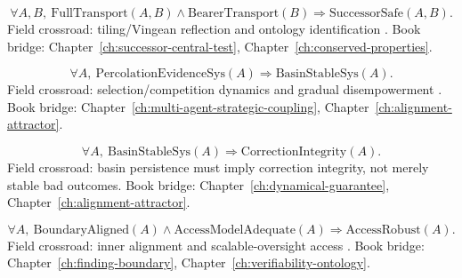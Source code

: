 \begin{assumption}
\label{appi:ass:mb5}
\begin{equation}
\label{appi:eq:mb5}
\forall A,B,\ \mathrm{FullTransport}(A,B)\wedge \mathrm{BearerTransport}(B)\Rightarrow \mathrm{SuccessorSafe}(A,B).
\end{equation}
Field crossroad: tiling/Vingean reflection and ontology identification \autocite{yudkowsky2013tiling,deblanc2011ontological}.
Book bridge: Chapter~\ref{ch:successor-central-test}, Chapter~\ref{ch:conserved-properties}.
\end{assumption}

\begin{assumption}
\label{appi:ass:mb6a}
\begin{equation}
\label{appi:eq:mb6a}
\forall A,\ \mathrm{PercolationEvidenceSys}(A)\Rightarrow \mathrm{BasinStableSys}(A).
\end{equation}
Field crossroad: selection/competition dynamics and gradual disempowerment \autocite{christiano2019failure,critch2020ai}.
Book bridge: Chapter~\ref{ch:multi-agent-strategic-coupling}, Chapter~\ref{ch:alignment-attractor}.
\end{assumption}

\begin{assumption}
\label{appi:ass:mb6b}
\begin{equation}
\label{appi:eq:mb6b}
\forall A,\ \mathrm{BasinStableSys}(A)\Rightarrow \mathrm{CorrectionIntegrity}(A).
\end{equation}
Field crossroad: basin persistence must imply correction integrity, not merely stable bad outcomes.
Book bridge: Chapter~\ref{ch:dynamical-guarantee}, Chapter~\ref{ch:alignment-attractor}.
\end{assumption}

\begin{assumption}
\label{appi:ass:mb7a}
\begin{equation}
\label{appi:eq:mb7a}
\forall A,\ \mathrm{BoundaryAligned}(A)\wedge \mathrm{AccessModelAdequate}(A)\Rightarrow \mathrm{AccessRobust}(A).
\end{equation}
Field crossroad: inner alignment and scalable-oversight access \autocite{hubinger2019risks,shlegeris2023aicontrol}.
Book bridge: Chapter~\ref{ch:finding-boundary}, Chapter~\ref{ch:verifiability-ontology}.
\end{assumption}

